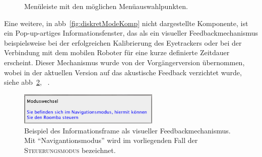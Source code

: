 \begin{figure}[ht]
\begin{center}
\end{center}
\caption{Menüleiste mit den möglichen Menüauswahlpunkten.}
\label{fig:menu}
\end{figure}

Eine weitere, in \acs{abb}~\ref{fig:diskretModeKomp} nicht dargestellte Komponente, ist ein Pop-up-artiges Informationsfenster, das als ein visueller Feedbackmechanismus beispielsweise bei der erfolgreichen Kalibrierung des Eyetrackers oder bei der Verbindung mit dem mobilen Roboter für eine kurze definierte Zeitdauer erscheint. Dieser Mechanismus wurde von der Vorgängerversion übernommen, wobei in der aktuellen Version auf das akustische Feedback verzichtet wurde, siehe \acs{abb}~\ref{fig:info}, \vgl~\cite{Eidam2015}.

\begin{figure}[ht]
\begin{center}
\includegraphics[width=0.6\textwidth]{bilder/implementierung/Infoframe.png}
\end{center}
\caption{Beispiel des Informationsframe als visueller Feedbackmechanismus. Mit \enquote{Navigantionsmodus} wird im vorliegenden Fall der \textsc{Steuerungsmodus} bezeichnet.}
\label{fig:info}
\end{figure}

